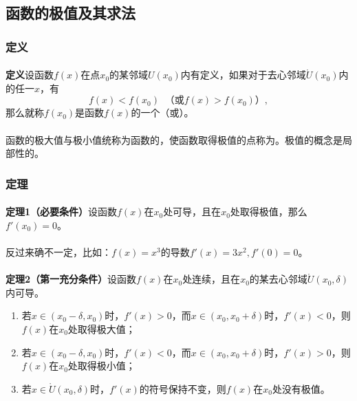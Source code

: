 \subsection{函数的极值及其求法}
\subsubsection{定义}
\paragraph{}
\textbf{定义\;}设函数$f(x)$在点$x_0$的某邻域$U(x_0)$内有定义，如果对于去心邻域$\mathring{U}(x_0)$内的任一$x$，有
\begin{equation}
  f(x) < f(x_0) \;\; \text{（或$f(x) > f(x_0)$）},
\end{equation}
那么就称$f(x_0)$是函数$f(x)$的一个（或）。

\paragraph{}
函数的极大值与极小值统称为函数的，使函数取得极值的点称为。极值的概念是局部性的。

\subsubsection{定理}
\paragraph{}
\textbf{定理1（必要条件）\;}设函数$f(x)$在$x_0$处可导，且在$x_0$处取得极值，那么$f'(x_0)=0$。

\paragraph{}
反过来确不一定，比如：$f(x)=x^3$的导数$f'(x)=3x^2, f'(0) = 0$。

\paragraph{}
\textbf{定理2（第一充分条件）\;}设函数$f(x)$在$x_0$处连续，且在$x_0$的某去心邻域$\mathring{U}(x_0,\delta)$内可导。
\begin{enumerate}
  \item 若$x\in (x_0 - \delta, x_0)$时，$f'(x) > 0$，而$x \in (x_0,x_0+\delta)$时，$f'(x) < 0$，则$f(x)$在$x_0$处取得极大值；
  \item 若$x\in(x_0-\delta,x_0)$时，$f'(x)<0$，而$x\in(x_0,x_0+\delta)$时，$f'(x)>0$，则$f(x)$在$x_0$处取得极小值；
  \item 若$x\in\mathring{U}(x_0,\delta)$时，$f'(x)$的符号保持不变，则$f(x)$在$x_0$处没有极值。
\end{enumerate}

